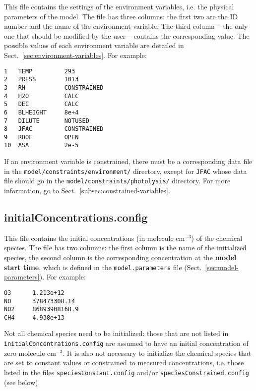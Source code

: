 This file contains the settings of the environment variables, i.e. the
physical parameters of the model. The file has three columns: the
first two are the ID number and the name of the environment variable.
The third column -- the only one that should be modified by the
user -- contains the corresponding value. The possible values
of each environment variable are detailed in
Sect.~\ref{sec:environment-variables}. For example:

\begin{verbatim}
1   TEMP         293
2   PRESS        1013
3   RH           CONSTRAINED
4   H2O          CALC
5   DEC          CALC
6   BLHEIGHT     8e+4
7   DILUTE       NOTUSED
8   JFAC         CONSTRAINED
9   ROOF         OPEN
10  ASA          2e-5
\end{verbatim}

If an environment variable is constrained, there must be a
corresponding data file in the \texttt{model/constraints/environment/}
directory, except for \texttt{JFAC} whose data file should go in the
\texttt{model/constraints/photolysis/} directory. For more
information, go to Sect.~\ref{subsec:constrained-variables}.

\subsection{initialConcentrations.config} \label{subsec:initialconcentrations}

This file contains the initial concentrations (in molecule cm$^{-3}$)
of the chemical species. The file has two columns: the first column is the
name of the initialized species, the second column is the corresponding
concentration at the \textbf{model start time}, which is defined
in the \texttt{model.parameters} file (Sect.~\ref{sec:model-parameters}).
For example:

\begin{verbatim}
O3      1.213e+12
NO      378473308.14
NO2     86893908168.9
CH4     4.938e+13
\end{verbatim}

Not all chemical species need to be initialized: those that are not
listed in \texttt{initialConcentrations.config} are assumed to have an
initial concentration of zero molecule cm$^{-3}$. It is also not necessary
to initialize the chemical species that are set to constant values or
constrained to measured concentrations, i.e. those listed in the files
\texttt{speciesConstant.config} and/or \texttt{speciesConstrained.config}
(see below).

